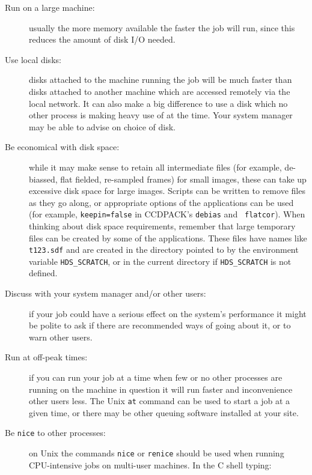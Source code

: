 \documentclass[twoside,11pt]{article}
\begin{document}
\begin{description}

  \item[Run on a large machine:] usually the more memory available the
   faster the job will run, since this reduces the amount of disk I/O needed.

  \item[Use local disks:] disks attached to the machine running the job will
   be much faster than disks attached to another machine which are accessed
   remotely via the local network.
   It can also make a big difference to use a disk which 
   no other process is making heavy use of at the time.
   Your system manager may be able to advise on choice of disk.

  \item[Be economical with disk space:] while it may make sense to retain
   all intermediate files (for example, de-biassed, flat fielded, re-sampled
   frames) for small images, these can take up excessive disk space
   for large images.
   Scripts can be written to remove files as they go along,
   or appropriate options of the applications can be used
   (for example, {\tt keepin=false} in CCDPACK's {\tt debias} and {\tt
   flatcor}).
   When thinking about disk space requirements, 
   remember that large temporary files can be created by
   some of the applications.
   These files have names like {\tt t123.sdf} and are created in the
   directory pointed to by the environment variable {\tt HDS\_SCRATCH},
   or in the current directory if {\tt HDS\_SCRATCH} is not defined.

  \item[Discuss with your system manager and/or other users:] if your job
   could have a serious effect on the system's performance it might be
   polite to ask if there are recommended ways of going about it, or to
   warn other users.

  \item[Run at off-peak times:] if you can run your job at a time when few
   or no other processes are running on the machine in question it will
   run faster and inconvenience other users less.
   The Unix {\tt at} command can be used to start a job at a given time, or
   there may be other queuing software installed at your site.

  \item[Be {\tt nice} to other processes:] on Unix the commands {\tt nice}
   or {\tt renice} should be used when running CPU-intensive jobs on
   multi-user machines.
   In the C shell typing:


\end{description}
\end{document}
